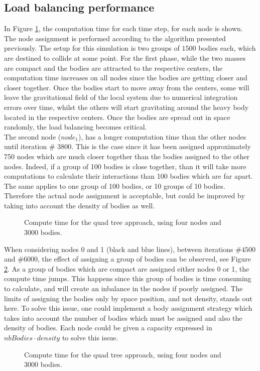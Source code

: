 \subsection{Load balancing performance}
In Figure \ref{fig:computeTimes:allnodes}, the computation time for each time step, for each node is shown. The node assignment is performed according to the algorithm presented previously. The setup for this simulation is two groups of $1500$ bodies each, which are destined to collide at some point. For the first phase, while the two masses are compact and the bodies are attracted to the respective centers, the computation time increases on all nodes since the bodies are getting closer and closer together. Once the bodies start to move away from the centers, some will leave the gravitational field of the local system due to numerical integration errors over time, whilst the others will start gravitating around the heavy body located in the respective centers. Once the bodies are spread out in space randomly, the load balancing becomes critical.\\
The second node ($node_1$), has a longer computation time than the other nodes until iteration $\#$ 3800. This is the case since it has been assigned approximately 750 nodes which are much closer together than the bodies assigned to the other nodes. Indeed, if a group of 100 bodies is close together, than it will take more computations to calculate their interactions than 100 bodies which are far apart. The same applies to one group of 100 bodies, or 10 groups of 10 bodies. Therefore the actual node assignment is acceptable, but could be improved by taking into account the density of bodies as well.\\
\begin{figure}[H]
\centering

\caption{Compute time for the quad tree approach, using four nodes and 3000 bodies.}
\label{fig:computeTimes:allnodes}
\end{figure}
\newpage
When considering nodes 0 and 1 (black and blue lines), between iterations $\#4500$ and $\#6000$, the effect of assigning a group of bodies can be observed, see Figure \ref{fig:computeTimes2Nodes:zoom}. As a group of bodies which are compact are assigned either nodes 0 or 1, the compute time jumps. This happens since this group of bodies is time consuming to calculate, and will create an inbalance in the nodes if poorly assigned. The limits of assigning the bodies only by space position, and not density, stands out here. To solve this issue, one could implement a body assignment strategy which takes into account the number of bodies which must be assigned and also the density of bodies. Each node could be given a capacity expressed in $nbBodies \cdot density$ to solve this issue.
\begin{figure}[h]
\centering

\caption{Compute time for the quad tree approach, using four nodes and 3000 bodies.}
\label{fig:computeTimes2Nodes:zoom}
\end{figure}
